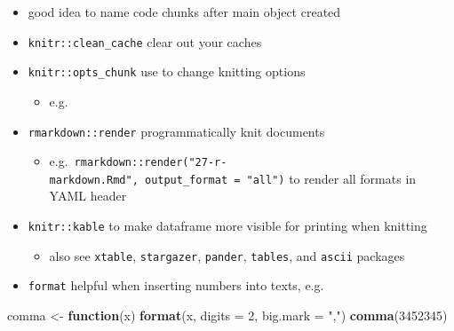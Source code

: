 \documentclass[]{book}
\newenvironment{Shaded}{\begin{snugshade}}{\end{snugshade}}
\newcommand{\CommentTok}[1]{\textcolor[rgb]{0.56,0.35,0.01}{\textit{#1}}}
\newcommand{\ControlFlowTok}[1]{\textcolor[rgb]{0.13,0.29,0.53}{\textbf{#1}}}
\newcommand{\DataTypeTok}[1]{\textcolor[rgb]{0.13,0.29,0.53}{#1}}
\newcommand{\DecValTok}[1]{\textcolor[rgb]{0.00,0.00,0.81}{#1}}
\newcommand{\KeywordTok}[1]{\textcolor[rgb]{0.13,0.29,0.53}{\textbf{#1}}}
\newcommand{\NormalTok}[1]{#1}
\newcommand{\OperatorTok}[1]{\textcolor[rgb]{0.81,0.36,0.00}{\textbf{#1}}}
\newcommand{\OtherTok}[1]{\textcolor[rgb]{0.56,0.35,0.01}{#1}}
\newcommand{\StringTok}[1]{\textcolor[rgb]{0.31,0.60,0.02}{#1}}
\providecommand{\tightlist}{%
  \setlength{\itemsep}{0pt}\setlength{\parskip}{0pt}}
\theoremstyle{definition}
\theoremstyle{definition}
\theoremstyle{definition}
\theoremstyle{remark}
\begin{document}
\begin{itemize}
\tightlist
\item
  good idea to name code chunks after main object created
\item
  \texttt{knitr::clean\_cache} clear out your caches
\item
  \texttt{knitr::opts\_chunk} use to change knitting options

  \begin{itemize}
  \tightlist
  \item
    e.g.
  \end{itemize}

\begin{Shaded}
\end{Shaded}
\item
  \texttt{rmarkdown::render} programmatically knit documents

  \begin{itemize}
  \tightlist
  \item
    e.g.~\texttt{rmarkdown::render("27-r-markdown.Rmd",\ output\_format\ =\ "all")}
    to render all formats in YAML header
  \end{itemize}
\item
  \texttt{knitr::kable} to make dataframe more visible for printing when
  knitting

  \begin{itemize}
  \tightlist
  \item
    also see \texttt{xtable}, \texttt{stargazer}, \texttt{pander},
    \texttt{tables}, and \texttt{ascii} packages
  \end{itemize}
\item
  \texttt{format} helpful when inserting numbers into texts, e.g.
\end{itemize}

\begin{Shaded}
\begin{Highlighting}[]
\NormalTok{comma <-}\StringTok{ }\ControlFlowTok{function}\NormalTok{(x) }\KeywordTok{format}\NormalTok{(x, }\DataTypeTok{digits =} \DecValTok{2}\NormalTok{, }\DataTypeTok{big.mark =} \StringTok{","}\NormalTok{)}
\KeywordTok{comma}\NormalTok{(}\DecValTok{3452345}\NormalTok{)}
\end{Highlighting}
\end{Shaded}
\end{document}
